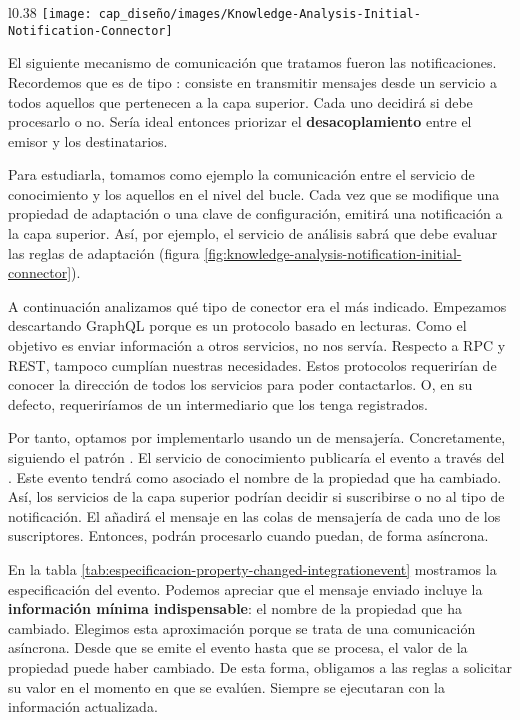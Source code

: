 \begin{wrapfigure}{l}{0.38\linewidth}
  \centering
  \texttt{[image: cap\_diseño/images/Knowledge-Analysis-Initial-Notification-Connector]}
  \caption{Representación inicial del conector entre el servicio de conocimiento y el de análisis.}
  \label{fig:knowledge-analysis-notification-initial-connector}
\end{wrapfigure}

El siguiente mecanismo de comunicación que tratamos fueron las notificaciones. Recordemos que es de tipo \textbf{}: consiste en transmitir mensajes desde un servicio a todos aquellos que pertenecen a la capa superior. Cada uno decidirá si debe procesarlo o no. Sería ideal entonces priorizar el \textbf{desacoplamiento} entre el emisor y los destinatarios.

Para estudiarla, tomamos como ejemplo la comunicación entre el servicio de conocimiento y los aquellos en el nivel del bucle. Cada vez que se modifique una propiedad de adaptación o una clave de configuración, emitirá una notificación a la capa superior. Así, por ejemplo, el servicio de análisis sabrá que debe evaluar las reglas de adaptación (figura \ref{fig:knowledge-analysis-notification-initial-connector}).

A continuación analizamos qué tipo de conector era el más indicado. Empezamos descartando GraphQL porque es un protocolo basado en lecturas. Como el objetivo es enviar información a otros servicios, no nos servía. Respecto a RPC y REST, tampoco cumplían nuestras necesidades. Estos protocolos requerirían de conocer la dirección de todos los servicios para poder contactarlos. O, en su defecto, requeriríamos de un intermediario que los tenga registrados.

Por tanto, optamos por implementarlo usando un  de mensajería. Concretamente, siguiendo el patrón \textbf{}. El servicio de conocimiento publicaría el evento a través del . Este evento tendrá como  asociado el nombre de la propiedad que ha cambiado. Así, los servicios de la capa superior podrían decidir si suscribirse o no al tipo de notificación. El  añadirá el mensaje en las colas de mensajería de cada uno de los suscriptores. Entonces, podrán procesarlo cuando puedan, de forma asíncrona.

En la tabla \ref{tab:especificacion-property-changed-integrationevent} mostramos la especificación del evento. Podemos apreciar que el mensaje enviado incluye la \textbf{información mínima indispensable}: el nombre de la propiedad que ha cambiado. Elegimos esta aproximación porque se trata de una comunicación asíncrona. Desde que se emite el evento hasta que se procesa, el valor de la propiedad puede haber cambiado. De esta forma, obligamos a las reglas a solicitar su valor en el momento en que se evalúen. Siempre se ejecutaran con la información actualizada.

